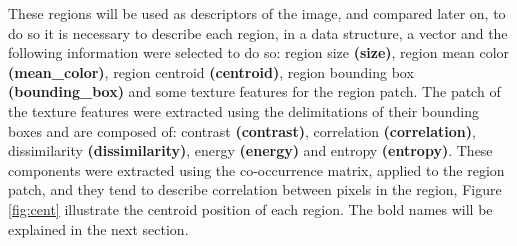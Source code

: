\documentclass[12pt,a4paper]{article}
\begin{document}
\newpage

	These regions will be used as descriptors of the image, and compared later on, to do so it is necessary to describe each region, in a data structure,  a vector and the following information were selected to do so: region size \textbf{(size)}, region mean color \textbf{(mean\_color)}, region centroid \textbf{(centroid)}, region bounding box \textbf{(bounding\_box)} and some texture features for the region patch. The patch of the texture features were extracted using the delimitations of their bounding boxes and are composed of: contrast \textbf{(contrast)}, correlation \textbf{(correlation)}, dissimilarity \textbf{(dissimilarity)}, energy \textbf{(energy)} and entropy \textbf{(entropy)}. These components were extracted using the co-occurrence matrix, applied to the region patch, and they tend to describe correlation between pixels in the region, Figure \ref{fig:cent} illustrate the centroid position of each region. The bold names will be explained in the next section.
\end{document}
